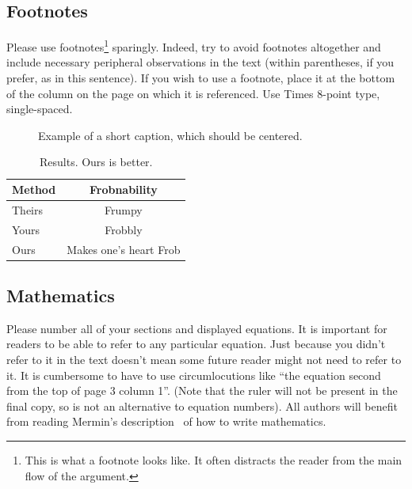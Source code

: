 \documentclass{bmvc2k}
\begin{document}
\subsection{Footnotes}

Please use footnotes\footnote {This is what a footnote looks like.  It
often distracts the reader from the main flow of the argument.} sparingly.
Indeed, try to avoid footnotes altogether and include necessary peripheral
observations in
the text (within parentheses, if you prefer, as in this sentence).  If you
wish to use a footnote, place it at the bottom of the column on the page on
which it is referenced. Use Times 8-point type, single-spaced.


\begin{figure}
\begin{center}
\fbox{\rule{0pt}{2in} \rule{.9\linewidth}{0pt}}
\end{center}
   \caption{Example of a short caption, which should be centered.}
\label{fig:short}
\end{figure}

\begin{table}
\begin{center}
\begin{tabular}{|l|c|}
\hline
Method & Frobnability \\
\hline\hline
Theirs & Frumpy \\
Yours & Frobbly \\
Ours & Makes one's heart Frob\\
\hline
\end{tabular}
\end{center}
\caption{Results.   Ours is better.}
\end{table}

\subsection{Mathematics}

Please number all of your sections and displayed equations.  It is
important for readers to be able to refer to any particular equation.  Just
because you didn't refer to it in the text doesn't mean some future reader
might not need to refer to it.  It is cumbersome to have to use
circumlocutions like ``the equation second from the top of page 3 column
1''.  (Note that the ruler will not be present in the final copy, so is not
an alternative to equation numbers).  All authors will benefit from reading
Mermin's description~\cite{Mermin89} of how to write mathematics.
\end{document}
